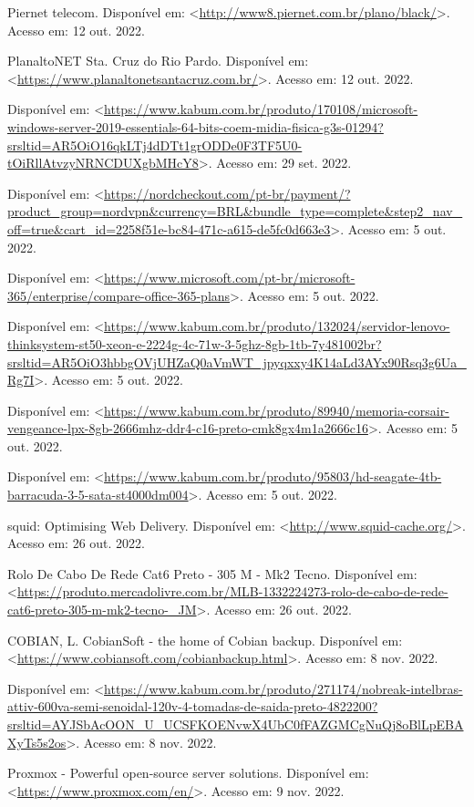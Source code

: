 \documentclass[12pt]{article}
\begin{document}
Piernet telecom. Disponível em: <\url{http://www8.piernet.com.br/plano/black/}>. Acesso em: 12 out. 2022.

PlanaltoNET Sta. Cruz do Rio Pardo. Disponível em: <\url{https://www.planaltonetsantacruz.com.br/}>. Acesso em: 12 out. 2022.

Disponível em:
<\url{https://www.kabum.com.br/produto/170108/microsoft-windows-server-2019-essentials-64-bits-coem-midia-fisica-g3s-01294?srsltid=AR5OiO16qkLTj4dDTt1grODDe0F3TF5U0-tOiRllAtvzyNRNCDUXgbMHcY8}>. Acesso em: 29 set. 2022.

Disponível em: <\url{https://nordcheckout.com/pt-br/payment/?product_group=nordvpn&currency=BRL&bundle_type=complete&step2_nav_off=true&cart_id=2258f51e-bc84-471c-a615-de5fc0d663e3}>. Acesso em: 5 out. 2022.

Disponível em: <\url{https://www.microsoft.com/pt-br/microsoft-365/enterprise/compare-office-365-plans}>. Acesso em: 5 out. 2022.

Disponível em: <\url{https://www.kabum.com.br/produto/132024/servidor-lenovo-thinksystem-st50-xeon-e-2224g-4c-71w-3-5ghz-8gb-1tb-7y481002br?srsltid=AR5OiO3hbbgOVjUHZaQ0aVmWT_jpyqxxy4K14aLd3AYx90Rsq3g6Ua_Rg7I}>. Acesso em: 5 out. 2022.

Disponível em: <\url{https://www.kabum.com.br/produto/89940/memoria-corsair-vengeance-lpx-8gb-2666mhz-ddr4-c16-preto-cmk8gx4m1a2666c16}>. Acesso em: 5 out. 2022.

Disponível em: <\url{https://www.kabum.com.br/produto/95803/hd-seagate-4tb-barracuda-3-5-sata-st4000dm004}>. Acesso em: 5 out. 2022.

squid: Optimising Web Delivery. Disponível em: <\url{http://www.squid-cache.org/}>. Acesso em: 26 out. 2022.

Rolo De Cabo De Rede Cat6 Preto - 305 M - Mk2 Tecno. Disponível em: <\url{https://produto.mercadolivre.com.br/MLB-1332224273-rolo-de-cabo-de-rede-cat6-preto-305-m-mk2-tecno-_JM}>. Acesso em: 26 out. 2022.

COBIAN, L. CobianSoft - the home of Cobian backup. Disponível em: <\url{https://www.cobiansoft.com/cobianbackup.html}>. Acesso em: 8 nov. 2022.

Disponível em: <\url{https://www.kabum.com.br/produto/271174/nobreak-intelbras-attiv-600va-semi-senoidal-120v-4-tomadas-de-saida-preto-4822200?srsltid=AYJSbAcOON_U_UCSFKOENvwX4UbC0fFAZGMCgNuQj8oBlLpEBAXyTs5s2os}>. Acesso em: 8 nov. 2022.

Proxmox - Powerful open-source server solutions. Disponível em: <\url{https://www.proxmox.com/en/}>. Acesso em: 9 nov. 2022.
\end{document}
